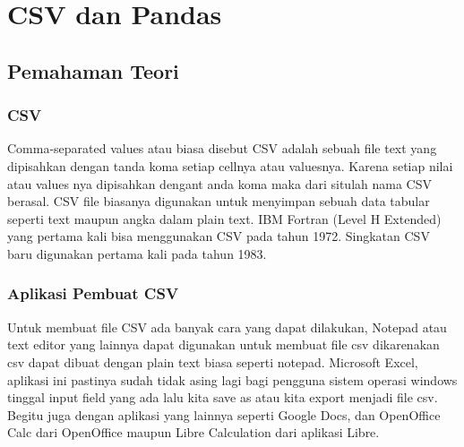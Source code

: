 \chapter{CSV dan Pandas}

\section{Pemahaman Teori}

\subsection{CSV}
Comma-separated values atau biasa disebut CSV adalah sebuah file text yang dipisahkan dengan tanda koma setiap cellnya atau valuesnya. Karena setiap nilai atau values nya dipisahkan dengant anda koma maka dari situlah nama CSV berasal. CSV file biasanya digunakan untuk menyimpan sebuah data tabular seperti text maupun angka dalam plain text. IBM Fortran (Level H Extended) yang pertama kali bisa menggunakan CSV pada tahun 1972. Singkatan CSV baru digunakan pertama kali pada tahun 1983.

\subsection{Aplikasi Pembuat CSV}
Untuk membuat file CSV ada banyak cara yang dapat dilakukan, Notepad atau text editor yang lainnya dapat digunakan untuk membuat file csv dikarenakan csv dapat dibuat dengan plain text biasa seperti notepad. Microsoft Excel, aplikasi ini pastinya sudah tidak asing lagi bagi pengguna sistem operasi windows tinggal input field yang ada lalu kita save as atau kita export menjadi file csv. Begitu juga dengan aplikasi yang lainnya seperti Google Docs, dan OpenOffice Calc dari OpenOffice maupun Libre Calculation dari aplikasi Libre.

